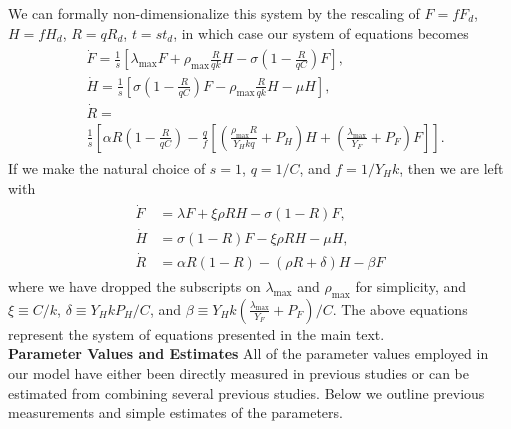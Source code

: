 \documentclass[twocolumn,preprintnumbers,amsmath,amssymb,superscriptaddress]{revtex4}
\begin{document}
We can formally non-dimensionalize this system by the rescaling of $F=fF_{d}$, $H=fH_{d}$, $R=qR_{d}$, $t=st_{d}$, in which case our system of equations becomes
\begin{align}
\begin{split}
&\dot{F} = \frac{1}{s}\left[\lambda_{\text{max}} F + \rho_{\text{max}}\frac{R}{qk}H - \sigma \left(1-\frac{R}{qC}\right)F\right],  \\
&\dot{H} = \frac{1}{s}\left[\sigma \left(1-\frac{R}{qC}\right)F - \rho_{\text{max}}\frac{R}{qk} H - \mu H\right],  \\
& \dot{R} = \\
&\frac{1}{s}\left[\alpha R\left(1-\frac{R}{qC}\right) -\frac{q}{f}\left[\left(\frac{\rho_{\text{max}}R}{Y_{H}kq}+P_{H}\right)H+\left(\frac{\lambda_{\text{max}}}{Y_{F}}+P_{F}\right)F\right]\right].
\end{split}
\end{align}
If we make the natural choice of $s=1$, $q=1/C$, and $f=1/Y_{H}k$, then we are left with
\begin{align}
\begin{split}
\dot{F} &= \lambda F + \xi \rho RH - \sigma \left(1-R\right)F,  \\
\dot{H} &= \sigma \left(1-R\right)F - \xi \rho RH - \mu H,  \\
\dot{R} &= \alpha R\left(1-R\right) -\left(\rho R+\delta\right)H-\beta F
\label{reduceddynamics}
\end{split}
\end{align}
where we have dropped the subscripts on $\lambda_{\text{max}}$ and $\rho_{\text{max}}$ for simplicity, and $\xi\equiv C/k$, $\delta\equiv Y_{H}kP_{H}/C$, and $\beta\equiv Y_{H}k\left(\frac{\lambda_{\text{max}}}{Y_{F}}+P_{F}\right)/C$. The above equations represent the system of equations presented in the main text.
\\

{\bf Parameter Values and Estimates}
All of the parameter values employed in our model have either been directly measured in previous studies or can be estimated from combining several previous studies. Below we outline previous measurements and simple estimates of the parameters.
\end{document}
